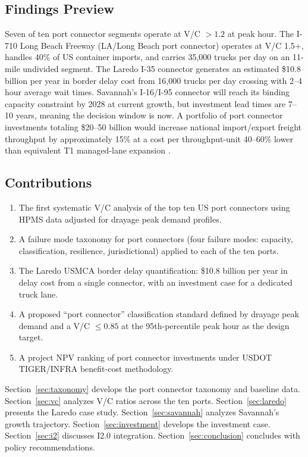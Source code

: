 \subsection{Findings Preview}

Seven of ten port connector segments operate at V/C $> 1.2$ at peak hour. The I-710 Long Beach Freeway (LA/Long Beach port connector) operates at V/C 1.5+, handles 40\% of US container imports, and carries 35,000 trucks per day on an 11-mile undivided segment. The Laredo I-35 connector generates an estimated \$10.8 billion per year in border delay cost from 16,000 trucks per day crossing with 2--4 hour average wait times. Savannah's I-16/I-95 connector will reach its binding capacity constraint by 2028 at current growth, but investment lead times are 7--10 years, meaning the decision window is now. A portfolio of port connector investments totaling \$20--50 billion would increase national import/export freight throughput by approximately 15\% at a cost per throughput-unit 40--60\% lower than equivalent T1 managed-lane expansion \citep{ROUTE_B1, ROUTE_B2}.

\subsection{Contributions}

\begin{enumerate}
  \item The first systematic V/C analysis of the top ten US port connectors using HPMS data adjusted for drayage peak demand profiles.
  \item A failure mode taxonomy for port connectors (four failure modes: capacity, classification, resilience, jurisdictional) applied to each of the ten ports.
  \item The Laredo USMCA border delay quantification: \$10.8 billion per year in delay cost from a single connector, with an investment case for a dedicated truck lane.
  \item A proposed ``port connector'' classification standard defined by drayage peak demand and a V/C $\leq 0.85$ at the 95th-percentile peak hour as the design target.
  \item A project NPV ranking of port connector investments under USDOT TIGER/INFRA benefit-cost methodology.
\end{enumerate}

Section~\ref{sec:taxonomy} develops the port connector taxonomy and baseline data. Section~\ref{sec:vc} analyzes V/C ratios across the ten ports. Section~\ref{sec:laredo} presents the Laredo case study. Section~\ref{sec:savannah} analyzes Savannah's growth trajectory. Section~\ref{sec:investment} develops the investment case. Section~\ref{sec:i2} discusses I2.0 integration. Section~\ref{sec:conclusion} concludes with policy recommendations.
